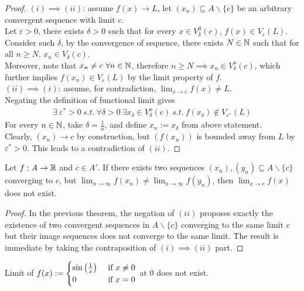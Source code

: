 \documentclass[11pt]{article}
\begin{document}
	\begin{proof}
		$(i) \implies (ii)$: assume $f(x) \to L$, let $(x_n) \subseteq A \backslash \{c\}$ be an arbitrary convergent sequence with limit $c$. \\
		Let $\varepsilon > 0$, there exists $\delta > 0$ such that for every $x \in V_\delta^0(c)$, $f(x) \in V_\varepsilon(L)$.\\
		Consider such $\delta$, by the convergence of sequence, there exists $N \in \mathbb{N}$ such that for all $n \geq N$, $x_n \in V_\delta(c)$.\\
		Moreover, note that $x_n \neq c\ \forall n \in \mathbb{N}$, therefore $n \geq N \implies x_n \in V_\delta^o(c)$, which further implies $f(x_n) \in V_\varepsilon(L)$ by the limit property of $f$. \\
		$(ii) \implies (i)$: assume, for contradiction, $\lim_{x \to c} f(x) \neq L$.\\
		Negating the definition of functional limit gives
		\begin{align}
			\exists\ \varepsilon^* > 0\ s.t.\ \forall \delta > 0\ \exists x_\delta \in V_\delta^o(c)\ s.t.\ f(x_\delta) \notin V_{\varepsilon^*}(L)
		\end{align}
		For every $n \in \mathbb{N}$, take $\delta = \frac{1}{n}$, and define $x_n := x_\delta$ from above statement.\\
		Clearly, $(x_n) \to c$ by construction, but $(f(x_n))$ is bounded away from $L$ by $\varepsilon^* > 0$. This leads to a contradiction of $(ii)$.
	\end{proof}
	
	\begin{theorem}
		Let $f: A \to \mathbb{R}$ and $c \in A'$. If there exists two sequences $(x_n), (y_n) \subseteq A \backslash \{c\}$ converging to $c$, but $\lim_{n\to\infty} f(x_n) \neq \lim_{n\to\infty} f(y_n)$, then $\lim_{x \to c} f(x)$ does not exist.
	\end{theorem}
	
	\begin{proof}
		In the previous theorem, the negation of $(ii)$ proposes exactly the existence of two convergent sequences in $A \backslash \{c\}$ converging to the same limit $c$ but their image sequences does not converge to the same limit. The result is immediate by taking the contraposition of $(i) \implies (ii)$ part.
	\end{proof}
	
	\begin{example}
		Limit of $f(x) := \begin{cases}
			\sin\left(\frac{1}{x}\right) &\text{{ if }} x \neq 0 \\
			0 &\text{{ if }} x = 0
		\end{cases}$ at 0 does not exist.
	\end{example}
	
\end{document}
